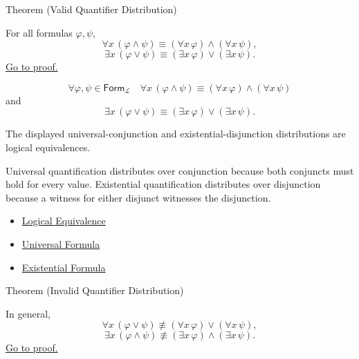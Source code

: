 \begin{theorembox}{Theorem (Valid Quantifier Distribution)}
\begin{theorem}
\label{thm:qdist}
For all formulas \(\varphi,\psi\),
\[
\forall x\,(\varphi\land\psi)
\equiv
(\forall x\,\varphi)\land(\forall x\,\psi),
\]
\[
\exists x\,(\varphi\lor\psi)
\equiv
(\exists x\,\varphi)\lor(\exists x\,\psi).
\]
\hyperref[prf:qdist]{Go to proof.}
\end{theorem}
\end{theorembox}

\begin{remark*}
\[
\forall \varphi,\psi\in\mathsf{Form}_{\mathcal L}\quad
\forall x\,(\varphi\land\psi)
\equiv
(\forall x\,\varphi)\land(\forall x\,\psi)
\]
and
\[
\exists x\,(\varphi\lor\psi)
\equiv
(\exists x\,\varphi)\lor(\exists x\,\psi).
\]
\end{remark*}

\begin{remark*}
The displayed universal-conjunction and existential-disjunction distributions
are logical equivalences.
\end{remark*}

\begin{remark*}[Interpretation]
Universal quantification distributes over conjunction because both conjuncts
must hold for every value. Existential quantification distributes over
disjunction because a witness for either disjunct witnesses the disjunction.
\end{remark*}

\begin{dependencies}
\begin{itemize}
  \item \hyperref[def:log-equiv]{Logical Equivalence}
  \item \hyperref[def:universal-q]{Universal Formula}
  \item \hyperref[def:existential-q]{Existential Formula}
\end{itemize}
\end{dependencies}

\begin{theorembox}{Theorem (Invalid Quantifier Distribution)}
\begin{theorem}
\label{thm:invalid-quantifier-distribution}
In general,
\[
\forall x\,(\varphi\lor\psi)
\not\equiv
(\forall x\,\varphi)\lor(\forall x\,\psi),
\]
\[
\exists x\,(\varphi\land\psi)
\not\equiv
(\exists x\,\varphi)\land(\exists x\,\psi).
\]
\hyperref[prf:invalid-quantifier-distribution]{Go to proof.}
\end{theorem}
\end{theorembox}


